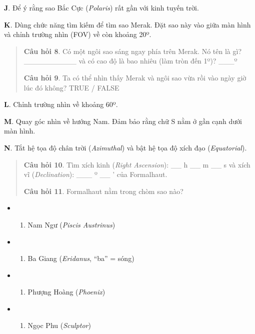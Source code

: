 \documentclass[
]{book}
\providecommand{\tightlist}{%
  \setlength{\itemsep}{0pt}\setlength{\parskip}{0pt}}
\begin{document}
\textbf{J}. Để ý rằng sao Bắc Cực (\emph{Polaris}) rất gần với kinh tuyến trời.

\textbf{K}. Dùng chức năng tìm kiếm để tìm sao Merak. Đặt sao này vào giữa màn hình và chỉnh trường nhìn (FOV) về còn khoảng 20º.

\begin{quote}
\textbf{Câu hỏi 8}. Có một ngôi sao sáng ngay phía trên Merak. Nó tên là gì?
\_\_\_\_\_\_\_\_\_\_
và có cao độ là bao nhiêu (làm tròn đến 1º)?
\_\_\_º

\textbf{Câu hỏi 9}. Ta có thể nhìn thấy Merak và ngôi sao vừa rồi vào ngày giờ lúc đó không?
TRUE / FALSE
\end{quote}

\textbf{L}. Chỉnh trường nhìn về khoảng 60º.

\textbf{M}. Quay góc nhìn về hướng Nam. Đảm bảo rằng chữ S nằm ở gần cạnh dưới màn hình.

\textbf{N}. Tắt hệ tọa độ chân trời (\emph{Azimuthal}) và bật hệ tọa độ xích đạo (\emph{Equatorial}).

\begin{quote}
\textbf{Câu hỏi 10}. Tìm xích kinh (\emph{Right Ascension}):
\_\_ h
\_\_ m
\_\_ s
và xích vĩ (\emph{Declination}):
\_\_\_ º
\_\_ '
của Formalhaut.

\textbf{Câu hỏi 11}. Formalhaut nằm trong chòm sao nào?
\end{quote}

\begin{itemize}
\tightlist
\item
  \begin{enumerate}
  \def\labelenumi{(\Alph{enumi})}
  \tightlist
  \item
    Nam Ngư (\emph{Piscis Austrinus})\\
  \end{enumerate}
\item
  \begin{enumerate}
  \def\labelenumi{(\Alph{enumi})}
  \setcounter{enumi}{1}
  \tightlist
  \item
    Ba Giang (\emph{Eridanus}, ``ba'' = sóng)\\
  \end{enumerate}
\item
  \begin{enumerate}
  \def\labelenumi{(\Alph{enumi})}
  \setcounter{enumi}{2}
  \tightlist
  \item
    Phượng Hoàng (\emph{Phoenix})\\
  \end{enumerate}
\item
  \begin{enumerate}
  \def\labelenumi{(\Alph{enumi})}
  \setcounter{enumi}{3}
  \tightlist
  \item
    Ngọc Phu (\emph{Sculptor})
  \end{enumerate}
\end{itemize}
\end{document}
